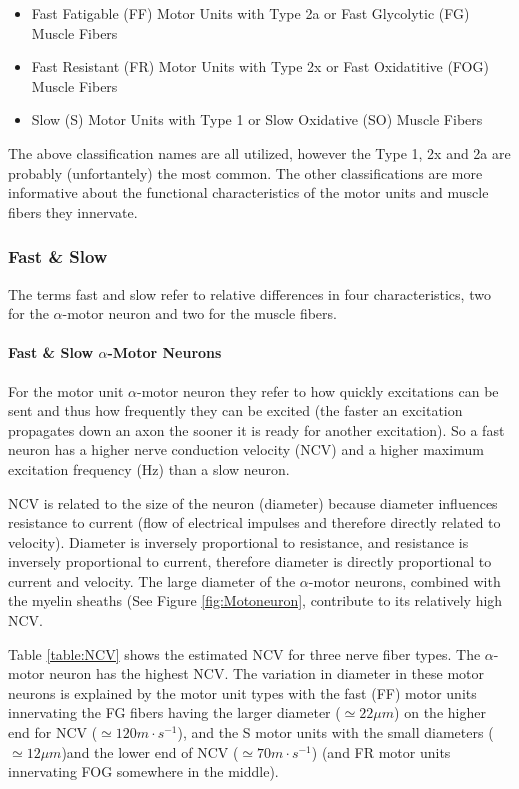 \begin{itemize}
    \item Fast Fatigable (FF) Motor Units with Type 2a or Fast Glycolytic (FG) Muscle Fibers
    \item Fast Resistant (FR) Motor Units with Type 2x or Fast Oxidatitive (FOG) Muscle Fibers
    \item Slow (S) Motor Units with Type 1 or Slow Oxidative (SO) Muscle Fibers
\end{itemize}

The above classification names are all utilized, however the Type 1, 2x and 2a are probably (unfortantely) the most common. The other classifications are more informative about the functional characteristics of the motor units and muscle fibers they innervate.

\subsubsection{Fast \& Slow}

The terms fast and slow refer to relative differences in four characteristics, two for the $\alpha$-motor neuron and two for the muscle fibers. 

\paragraph{Fast \& Slow $\alpha$-Motor Neurons}
For the motor unit $\alpha$-motor neuron they refer to how quickly excitations can be sent and thus how frequently they can be excited (the faster an excitation propagates down an axon the sooner it is ready for another excitation). So a fast neuron has a higher nerve conduction velocity (NCV) and a higher maximum excitation frequency (Hz) than a slow neuron.

NCV is related to the size of the neuron (diameter) because diameter influences resistance to current (flow of electrical impulses and therefore directly related to velocity). Diameter is inversely proportional to resistance, and resistance is inversely proportional to current, therefore diameter is directly proportional to current and velocity. The large diameter of the $\alpha$-motor neurons, combined with the myelin sheaths (See Figure \ref{fig:Motoneuron}, contribute to its relatively high NCV. 

Table \ref{table:NCV} shows the estimated NCV for three nerve fiber types. The $\alpha$-motor neuron has the highest NCV. The variation in diameter in these motor neurons is explained by the motor unit types with the fast (FF) motor units innervating the FG fibers having the larger diameter ($\simeq 22 \mu m$) on the higher end for NCV ($\simeq 120 m \cdot s^{-1}$), and the S motor units with the small diameters ($\simeq 12 \mu m$)and the lower end of NCV ($\simeq 70 m \cdot s^{-1}$) (and FR motor units innervating FOG somewhere in the middle). 

